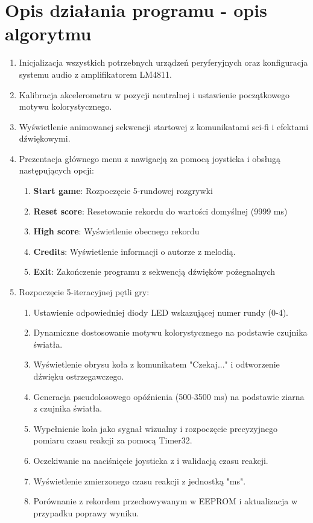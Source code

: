 \documentclass[letterpaper,11pt]{report}
\begin{document}
\chapter{Opis działania programu - opis algorytmu}
\begin{enumerate}
\item Inicjalizacja wszystkich potrzebnych urządzeń peryferyjnych oraz konfiguracja systemu audio z amplifikatorem LM4811.
\item Kalibracja akcelerometru w pozycji neutralnej i ustawienie początkowego motywu kolorystycznego.
\item Wyświetlenie animowanej sekwencji startowej z komunikatami sci-fi i efektami dźwiękowymi.
\item Prezentacja głównego menu z nawigacją za pomocą joysticka i obsługą następujących opcji:
\begin{enumerate}
\item \textbf{Start game}: Rozpoczęcie 5-rundowej rozgrywki
\item \textbf{Reset score}: Resetowanie rekordu do wartości domyślnej (9999 ms)
\item \textbf{High score}: Wyświetlenie obecnego rekordu
\item \textbf{Credits}: Wyświetlenie informacji o autorze z melodią.
\item \textbf{Exit}: Zakończenie programu z sekwencją dźwięków pożegnalnych
\end{enumerate}
\item Rozpoczęcie 5-iteracyjnej pętli gry:
\begin{enumerate}
\item Ustawienie odpowiedniej diody LED wskazującej numer rundy (0-4).
\item Dynamiczne dostosowanie motywu kolorystycznego na podstawie czujnika światła.
\item Wyświetlenie obrysu koła z komunikatem "Czekaj..." i odtworzenie dźwięku ostrzegawczego.
\item Generacja pseudolosowego opóźnienia (500-3500 ms) na podstawie ziarna z czujnika światła.
\item Wypełnienie koła jako sygnał wizualny i rozpoczęcie precyzyjnego pomiaru czasu reakcji za pomocą Timer32.
\item Oczekiwanie na naciśnięcie joysticka z i walidacją czasu reakcji.
\item Wyświetlenie zmierzonego czasu reakcji z jednostką "ms".
\item Porównanie z rekordem przechowywanym w EEPROM i aktualizacja w przypadku poprawy wyniku.

\end{enumerate}
\end{enumerate}
\end{document}
